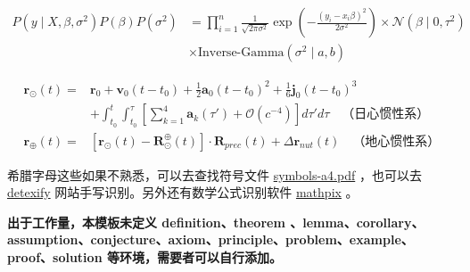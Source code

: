 \begin{equation}\begin{aligned}
P(y\mid X,\beta,\sigma^2)P(\beta)P(\sigma^2) & =\prod_{i=1}^n\frac{1}{\sqrt{2\pi\sigma^2}}\exp\left(-\frac{(y_i-x_i\beta)^2}{2\sigma^2}\right)\times\mathcal{N}(\beta\mid0,\tau^2) \\
 & \times\text{Inverse-Gamma}(\sigma^2\mid a,b)
\end{aligned}\end{equation}

\begin{align}
    \mathbf{r}_\odot(t)  = & \mathbf{r}_0  + \mathbf{v}_0(t-t_0) + \frac{1}{2}\mathbf{a}_0(t-t_0)^2 + \frac{1}{6}\mathbf{j}_0(t-t_0)^3 \\
      &  + \int_{t_0}^t\int_{t_0}^\tau\left[\sum_{k=1}^4\mathbf{a}_k(\tau') + \mathcal{O}(c^{-4})\right]d\tau'd\tau \quad \text{（日心惯性系）} \\
      \mathbf{r}_\oplus(t) = & \left[\mathbf{r}_\odot(t) - \mathbf{R}_\odot^\oplus(t)\right] \cdot \mathbf{R}_{prec}(t) + \Delta\mathbf{r}_{nut}(t)\quad \text{（地心惯性系）}
\end{align}



希腊字母这些如果不熟悉，可以去查找符号文件 \href{http://mirrors.ctan.org/info/symbols/comprehensive/symbols-a4.pdf}{symbols-a4.pdf} ，也可以去 \href{http://detexify.kirelabs.org/classify.html}{detexify} 网站手写识别。另外还有数学公式识别软件 \href{https://mathpix.com/}{mathpix} 。

\textbf{出于工作量，本模板未定义 definition、theorem 、lemma、corollary、assumption、conjecture、axiom、principle、problem、example、proof、solution 等环境，需要者可以自行添加。}

